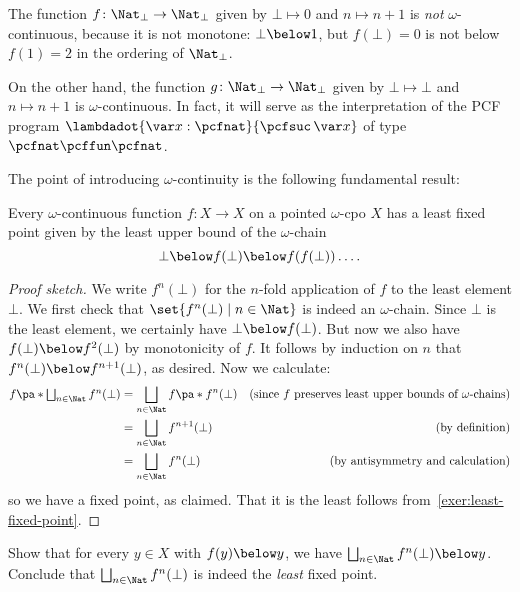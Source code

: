 \begin{example}
  The function \(f \colon \Nat_\bot \to \Nat_\bot\) given by \(\bot \mapsto 0\)
  and \(n \mapsto n + 1\) is \emph{not} \(\omega\)-continuous, because it is not
  monotone: \(\bot \below 1\), but \(f(\bot) = 0\) is not below \(f(1) = 2\) in
  the ordering of \(\Nat_\bot\).

  On the other hand, the function \(g \colon \Nat_\bot \to \Nat_\bot\) given by
  \(\bot \mapsto \bot\) and \(n \mapsto n+1\) is \(\omega\)-continuous.
  In fact, it will serve as the interpretation of the PCF program
  \(\lambdadot{\var x : \pcfnat}{\pcfsuc\,\var x}\) of type
  \(\pcfnat \pcffun \pcfnat\).
\end{example}

The point of introducing \(\omega\)-continuity is the following fundamental
result:

\begin{theorem}\label{least-fixed-point}
  Every \(\omega\)-continuous function \(f \colon X \to X\) on a pointed
  \(\omega\)-cpo \(X\) has a least fixed point given by the least upper bound of
  the \(\omega\)-chain
  \[
    \bot \below f(\bot) \below f(f(\bot)) \dots.
  \]
\end{theorem}
\begin{proof}[Proof sketch]
  We write \(f^n(\bot)\) for the \(n\)-fold application of \(f\) to the least
  element \(\bot\).
  We first check that \(\set{f^n(\bot) \mid n \in \Nat}\) is indeed an
  \(\omega\)-chain.
  Since \(\bot\) is the least element, we certainly have
  \(\bot \below f(\bot)\). But now we also have \(f(\bot) \below f^2(\bot)\) by
  monotonicity of \(f\). It follows by induction on \(n\) that
  \(f^n(\bot) \below f^{n+1}(\bot)\), as desired.
  Now we calculate:
  \begin{align*}
    f\pa*{\textstyle\bigsqcup_{n \in \Nat}f^n(\bot)}
    &= \bigsqcup_{n \in \Nat}f\pa*{f^n(\bot)}
    &\text{(since \(f\) preserves least upper bounds of \(\omega\)-chains)} \\
    &= \bigsqcup_{n \in \Nat}f^{n+1}(\bot)
    &\text{(by definition)} \\
    &= \bigsqcup_{n \in \Nat}f^{n}(\bot)
    &\text{(by antisymmetry and calculation)}
  \end{align*}
  so we have a fixed point, as claimed. That it is the least follows
  from~\cref{exer:least-fixed-point}.
\end{proof}

\begin{exercise}\label{exer:least-fixed-point}
  Show that for every \(y \in X\) with \(f(y) \below y\), we have
  \(\bigsqcup_{n \in \Nat}f^n(\bot) \below y\).
  Conclude that \(\bigsqcup_{n \in \Nat}f^n(\bot)\) is indeed the \emph{least} fixed point.
\end{exercise}

